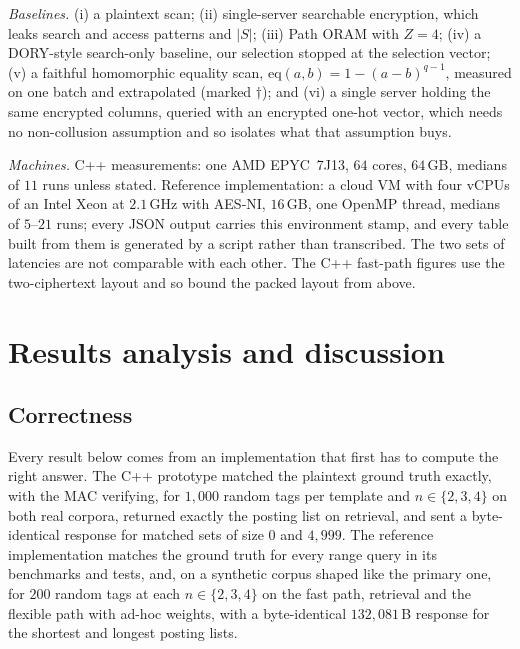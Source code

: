 \documentclass[a4paper,fleqn]{cas-sc}
\newif\ifauthorchecks
\newcommand{\authorcheck}[1]{\ifauthorchecks{\color{red}\textsf{[Authors: #1]}}\fi}
\begin{document}
\emph{Baselines.} (i) a plaintext scan; (ii) single-server searchable
encryption, which leaks search and access patterns and $|S|$; (iii) Path ORAM
with $Z=4$; (iv) a DORY-style \citep{dory} search-only baseline, our selection
stopped at the selection vector; (v) a faithful homomorphic equality scan,
$\mathrm{eq}(a,b)=1-(a-b)^{q-1}$, measured on one batch and extrapolated (marked
$\dagger$); and (vi) a single server holding the same encrypted columns,
queried with an encrypted one-hot vector, which needs no non-collusion
assumption and so isolates what that assumption buys.

\emph{Machines.} C++ measurements: one AMD EPYC~7J13, $64$ cores, $64$\,GB,
medians of $11$ runs unless stated. Reference implementation: a cloud VM with
four vCPUs of an Intel Xeon at $2.1$\,GHz with AES-NI, $16$\,GB, one OpenMP
thread, medians of $5$--$21$ runs; every JSON output carries this environment
stamp, and every table built from them is generated by a script rather than
transcribed. The two sets of latencies are not comparable with each other. The
C++ fast-path figures use the two-ciphertext layout and so bound the packed
layout from above. \authorcheck{Re-measure Tables~\ref{tab:compute},
\ref{tab:baselines} and~\ref{tab:wan} with the packed, compressed layout in
C++.}

\section{Results analysis and discussion}
\label{sec:resultsdisc}

\subsection{Correctness}
\label{sec:correctness}
Every result below comes from an implementation that first has to compute the
right answer. The C++ prototype matched the plaintext ground truth exactly, with
the MAC verifying, for $1{,}000$ random tags per template and $n\in\{2,3,4\}$ on
both real corpora, returned exactly the posting list on retrieval, and sent a
byte-identical response for matched sets of size $0$ and $4{,}999$. The
reference implementation matches the ground truth for every range query in its
benchmarks and tests, and, on a synthetic corpus shaped like the primary one,
for $200$ random tags at each $n\in\{2,3,4\}$ on the fast path, retrieval and
the flexible path with ad-hoc weights, with a byte-identical $132{,}081$\,B
response for the shortest and longest posting lists.
\authorcheck{Run bench/correctness.py on both real corpora (it needs the raw
files, see data/README.md) and report the counts here.}
\end{document}
